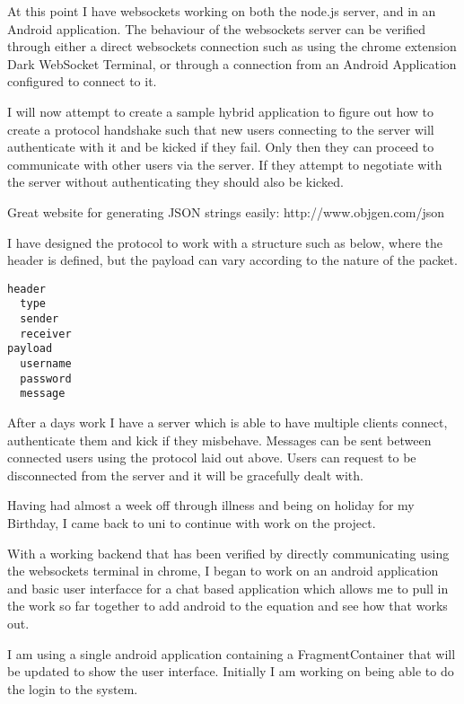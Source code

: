 \documentclass[idxtotoc,hyperref,openany]{labbook} %
\begin{document}

At this point I have websockets working on both the node.js server, and in an Android application.  The behaviour of the websockets server can be verified through either a direct websockets connection such as using the chrome extension Dark WebSocket Terminal, or through a connection from an Android Application configured to connect to it.

I will now attempt to create a sample hybrid application to figure out how to create a protocol handshake such that new users connecting to the server will authenticate with it and be kicked if they fail.  Only then they can proceed to communicate with other users via the server.  If they attempt to negotiate with the server without authenticating they should also be kicked.

Great website for generating JSON strings easily: http://www.objgen.com/json

I have designed the protocol to work with a structure such as below, where the header is defined, but the payload can vary according to the nature of the packet.

\begin{lstlisting}
header
  type
  sender
  receiver
payload
  username
  password
  message
 \end{lstlisting}

 After a days work I have a server which is able to have multiple clients connect, authenticate them and kick if they misbehave.  Messages can be sent between connected users using the protocol laid out above.  Users can request to be disconnected from the server and it will be gracefully dealt with.



 Having had almost a week off through illness and being on holiday for my Birthday, I came back to uni to continue with work on the project.

 With a working backend that has been verified by directly communicating using the websockets terminal in chrome, I began to work on an android application and basic user interfacce for a chat based application which allows me to pull in the work so far together to add android to the equation and see how that works out.

 I am using a single android application containing a FragmentContainer that will be updated to show the user interface.  Initially I am working on being able to do the login to the system.
\end{document}
